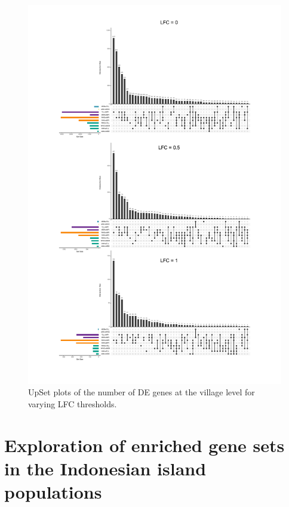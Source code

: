 \documentclass[12pt,a4paper,titlepage,twoside,openright]{book}
\begin{document}
\begin{mainmatter}
{\begin{figure}[htb!]
\centering
\includegraphics[width=\textwidth,height=\textheight,keepaspectratio]{Figures/UpsetR_Village_AllLFCs.pdf}
\caption{UpSet plots of the number of DE genes at the village level for varying LFC thresholds.}
\label{fig:UpsetR Village}
\end{figure}

\section{Exploration of enriched gene sets in the Indonesian island populations}

}
\end{mainmatter}
\end{document}
